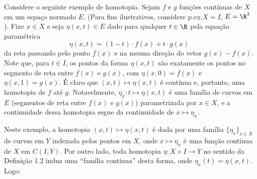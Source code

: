 Considere o seguinte exemplo de homotopia. Sejam $f$ e $g$ funções contínuas de $X$ em um espaço normado $E$. (Para fins ilustrativos, considere p.\@ ex.\@ $X = I$, $E = \R^2$). Fixe $x \in X$ e seja $\eta(x, t) \in E$ dado para qualquer $t \in \R$ pela equação paramétrica%
\linebreak\vspace{-0.5em}
%
\begin{equation}
        \eta(x, t)
    =   (1 - t) \cdot f(x) + t \cdot g(x)
\label{eq:homotopia_linear}
\end{equation}
da reta passando pelo ponto $f(x)$ e na mesma direção do vetor $g(x) - f(x)$. Note que, para $t \in I$, os pontos da forma $\eta(x, t)$ são exatamente os pontos no segmento de reta entre $f(x)$ e $g(x)$, com $\eta(x, 0) = f(x)$ e $\eta(x, 1) = g(x)$. É claro que $(x, t) \mapsto \eta(x, t)$ é contínua e, portanto, uma homotopia de $f$ até $g$. Notavelmente, $\eta_x : t \mapsto \eta(x, t)$ é uma família de curvas em $E$ (segmentos de reta entre $f(x)$ e $g(x)$) parametrizada por $x \in X$, e a continuidade dessa homotopia segue da continuidade de $x \mapsto \eta_x$.%
\linebreak\vspace{-1.2em}

\begin{figure}[htpb]
\centering
{}
\end{figure}

Neste exemplo, a homotopia $(x, t) \mapsto \eta(x, t)$ é dada por uma família $\{ \eta_x \}_{ x \in X }$ de curvas em $Y$ indexada pelos pontos em $X$, onde $x \mapsto \eta_x$ é uma função contínua de $X$ em $C(I, Y)$. Por outro lado, toda homotopia $\eta : X \times I \to Y$ no sentido da Definição 1.2 induz uma ``família contínua'' desta forma, onde $\eta_x(t) = \eta(x, t)$. Logo:%
\linebreak\vspace{-1.2em}

